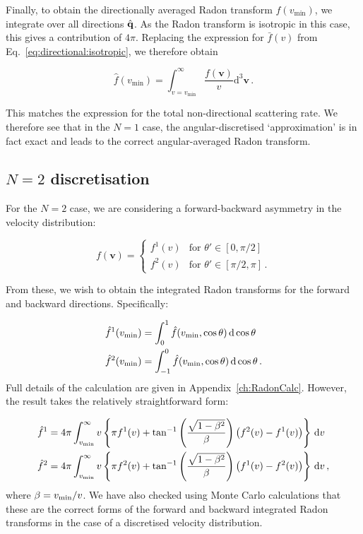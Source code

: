 Finally, to obtain the directionally averaged Radon transform $\hat{f}(v_\textrm{min})$, we integrate over all directions $\hat{\textbf{q}}$. As the Radon transform is isotropic in this case, this gives a contribution of $4\pi$. Replacing the expression for $\bar{f}(v)$ from Eq.~\ref{eq:directional:isotropic}, we therefore obtain

\begin{equation}
\hat{f}\left(v_\textrm{min}\right) = \int_{v=v_\textrm{min}}^\infty \frac{f(\textbf{v})}{v} \mathrm{d}^3\textbf{v}\,.
\end{equation}

This matches the expression for the total non-directional scattering rate. We therefore see that in the $N=1$ case, the angular-discretised `approximation' is in fact exact and leads to the correct angular-averaged Radon transform.


\subsection{$N=2$ discretisation}


For the $N=2$ case, we are considering a forward-backward asymmetry in the velocity distribution:

\begin{equation}
\label{eq:directional:N2}
f(\mathbf{v}) =
\begin{cases}
f^1(v) & \textrm{for } \theta' \in [0, \pi/2] \\
f^2(v) & \textrm{for } \theta' \in [\pi/2, \pi]\,.
\end{cases}
\end{equation}

From these, we wish to obtain the integrated Radon transforms for the forward and backward directions. Specifically:

\begin{align}
\hat{f}^1(\vmin) &= \int_{0}^1 \hat{f}(\vmin,\cos\theta) \, \mathrm{d}\cos\theta \\
\hat{f}^2(\vmin) &= \int_{-1}^0 \hat{f}(\vmin, \cos\theta) \, \mathrm{d}\cos\theta \,.
\end{align}
Full details of the calculation are given in Appendix~\ref{ch:RadonCalc}. However, the result takes the relatively straightforward form:

\begin{align}
\label{eq:directional:N2result}
\hat{f}^1 &= 4\pi\int_{\vmin}^{\infty} v \left\{ \pi f^1(v) + \atan\left(\frac{\sqrt{1-\beta^2}}{\beta}\right)\left(f^2(v) - f^1(v)\right) \right\} \, \mathrm{d}v \\
\hat{f}^2 &= 4\pi\int_{\vmin}^{\infty} v \left\{ \pi f^2(v) + \atan\left(\frac{\sqrt{1-\beta^2}}{\beta}\right)\left(f^1(v) - f^2(v)\right) \right\} \, \mathrm{d}v\,,
\end{align}
where $\beta = \vmin/v$. We have also checked using Monte Carlo calculations that these are the correct forms of the forward and backward integrated Radon transforms in the case of a discretised velocity distribution.


